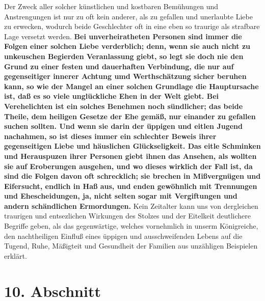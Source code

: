 Der Zweck aller solcher künstlichen und kostbaren Bemühungen und Anstrengungen
ist nur zu oft kein anderer, als zu gefallen und unerlaubte Liebe zu erwecken,
wodurch beide Geschlechter oft in eine eben so traurige als strafbare Lage
versetzt werden. \textbf{Bei
unverheiratheten Personen sind immer die Folgen einer
solchen Liebe verderblich; denn, wenn sie auch nicht zu unkeuschen Begierden
Veranlassung giebt, so legt sie doch nie den Grund zu einer festen und
dauerhaften Verbindung, die nur auf gegenseitiger innerer Achtung umd
Werthschätzung sicher beruhen kann, so wie der Mangel an einer solchen Grundlage
die Hauptursache ist, daß es so viele unglückliche Ehen in der Welt giebt. Bei
Verehelichten ist ein solches Benehmen noch sündlicher; das beide Theile, dem
heiligen Gesetze der Ehe gemäß, nur einander zu gefallen suchen sollten. Und
wenn sie darin der üppigen und eitlen Jugend nachahmen, so ist dieses immer ein
schlechter Beweis ihrer gegenseitigen Liebe und häuslichen Glückseligkeit. Das
eitle Schminken und Herauspuzen ihrer Personen giebt ihnen das Ansehen, als
wollten sie auf Eroberungen ausgehen, und wo dieses wirklich der Fall ist, da
sind die Folgen davon oft schrecklich; sie brechen in Mißvergnügen und
Eifersucht, endlich in Haß aus, und enden gewöhnlich mit Trennungen und
Ehescheidungen, ja, nicht selten sogar mit Vergiftungen und andern schändlichen
Ermordungen.} Kein Zeitalter kann uns von dergleichen traurigen und entsezlichen
Wirkungen des Stolzes und der Eitelkeit deutlichere Begriffe geben, als das
gegenwärtige, welches vornehmlich in unserm Königreiche, den nachtheiligen
Einfluß eines üppigen und ausschweifenden Lebens auf die Tugend, Ruhe, Mäßigteit
und Gesundheit der Familien aus unzähligen Beispielen erklärt.

\section{10. Abschnitt} \label{kap11_ab10}

